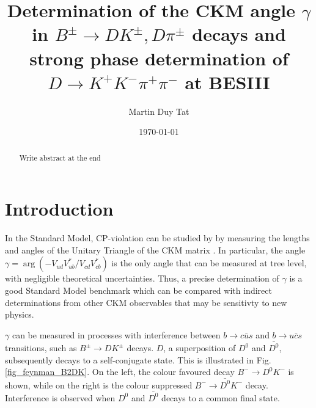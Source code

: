 \documentclass[12pt, a4paper, notitlepage, onecolumn]{article}
\title{Determination of the CKM angle $\gamma$ in $B^\pm\to DK^\pm, D\pi^\pm$ decays and strong phase determination of $D\to K^+K^-\pi^+\pi^-$ at BESIII}
\author{Martin Duy Tat}
\date{\today}
\numberwithin{equation}{section}
\begin{document}
\maketitle
\begin{abstract}
\noindent Write abstract at the end
\end{abstract}
\section{Introduction}
\noindent In the Standard Model, CP-violation can be studied by by measuring the lengths and angles of the Unitary Triangle of the CKM matrix \cite{cite_CKM}. In particular, the angle $\gamma = \arg(-V_{ud}V^*_{ub}/V_{cd}V^*_{cb})$ is the only angle that can be measured at tree level, with negligible theoretical uncertainties. Thus, a precise determination of $\gamma$ is a good Standard Model benchmark which can be compared with indirect determinations from other CKM observables that may be sensitivty to new physics.

$\gamma$ can be measured in processes with interference between $b\to c\bar{u}s$ and $b\to u\bar{c}s$ transitions, such as $B^\pm\to DK^\pm$ decays. $D$, a superposition of $D^0$ and $\bar{D^0}$, subsequently decays to a self-conjugate state. This is illustrated in Fig. \ref{fig_feynman_B2DK}. On the left, the colour favoured decay $B^-\to D^0K^-$ is shown, while on the right is the colour suppressed $B^-\to\bar{D^0}K^-$ decay. Interference is observed when $D^0$ and $\bar{D^0}$ decays to a common final state.
\end{document}
